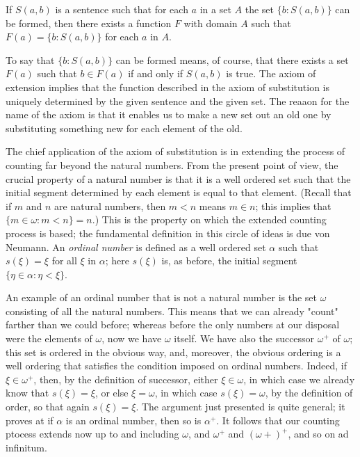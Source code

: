 \begin{named} If $S(a,b)$ is a sentence such that for each $a$ in a set $A$ the set $\{ b: S(a, b) \}$ can be formed, then there exists a function $F$ with domain $A$ such that $F(a) = \{ b: S(a,b) \} $ for each $a$ in $A$.
\end{named}

To say that $\{ b: S(a,b) \} $ can be formed means, of course, that there exists a set $F(a)$ such that $b \in F(a)$ if and only if $S(a,b)$ is true. The axiom of extension implies that the function described in the axiom of substitution is uniquely determined by the given sentence and the given set. The reaaon for the name of the axiom is that it enables us to make a new set out an old one by substituting something new for each element of the old. 

The chief application of the axiom of substitution is in extending the process of counting far beyond the natural numbers. From the present point of view, the crucial property of a natural number is that it is a well ordered set such that the initial segment determined by each element is equal to that element. (Recall that if $m$ and $n$ are natural numbers, then $m < n$ means $m \in n$; this implies that $\{ m \in \omega : m <n \} = n$.) This is the property on which the extended counting process is based; the fundamental definition in this circle of ideas is due von Neumann. An \textit{ordinal number} is defined as a well ordered set $\alpha$ such that $s( \xi ) = \xi$ for all $\xi $ in $\alpha$; here $s( \xi )$ is, as before, the initial segment $\{ \eta \in \alpha: \eta < \xi \} $.

An example of an ordinal number that is not a natural number is the set $\omega$ consisting of all the natural numbers. This means that we can already "count" farther than we could before; whereas before the only numbers at our disposal were the elements of $\omega$, now we have $\omega$ itself. We have also the successor $ \omega^{+}$ of $\omega$; this set is ordered in the obvious way, and, moreover, the obvious ordering is a well ordering that satisfies the condition imposed on ordinal numbers. Indeed, if $\xi \in \omega^{+}$, then, by the definition of successor, either $\xi \in \omega$, in which case we already know that $s( \xi ) = \xi$, or else $ \xi = \omega$, in which case $s( \xi ) =  \omega$, by the definition of order, so that again $s( \xi ) = \xi$. The argument just presented is quite general; it proves at if $\alpha$ is an ordinal number, then so is $\alpha^{+}$. It follows that our counting ptocess extends now up to and including $\omega$, and $\omega^{+}$ and $(\omega{+})^{+}$, and so on ad infinitum.

